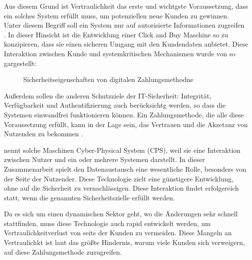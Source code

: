 \vspace{1cm}



Aus diesem Grund ist Vertraulichkeit das erste und wichtgste Voraussetzung, dass ein solches System 
erfüllt muss, um potenziellen neue Kunden zu gewinnen. Unter diesem Begriff soll ein System nur auf 
autorisierte Informationen zugreifen \cite{refbook:SWIS}. In dieser Hinsicht ist die Entwicklung 
einer Click and Buy Maschine so zu konzipieren, dass sie einen sicheren Umgang mit den Kundendaten
anbietet. Diese Interaktion zwischen Kunde und systemkritischen Mechanismen wurde von \cite{refart:HARE}
so gargestellt: 

\begin{figure}[htb]
    \caption{Sicherheitseigenschaften von digitalen Zahlungsmethodne}
    \label{fig:refark_HARE}
\end{figure}


Außerdem sollen die anderen Schutzziele der IT-Sicherheit: Integrität, Verfügbarkeit und
Authentifizierung auch berücksichtg werden, so dass die Systemen einwandfrei funktionieren können.
Ein Zahlungsmethode, die alle diese Voraussetzung erfüllt, kann in der Lage sein, das Vertrauen und 
die Akzetanz von Nutzenden zu bekommen \cite{refart:HARE}. \par


\cite{inbook:MHNS} nennt solche Maschinen Cyber-Physical System (CPS), weil sie eine Interaktion zwischen 
Nutzer und ein oder mehrere Systemen darstellt. In dieser Zusammenarbeit spielt den Datenaustausch 
eine wesentliche Rolle, besonders von der Seite der Nutzender. Diese Technologie zielt eine günstigere 
Entwicklung, ohne auf die Sicherheit zu vernachlässigen. Diese Interaktion findet erfolgereich statt, 
wenn die genannten Sicherheitszielle erfüllt werden.


Da es sich um einen dynamischen Sektor geht, wo die Änderungen sehr schnell stattfinden, \cite{S} 
muss diese Technologie auch rapid entwickelt werden, um Vertraulichkeitverlust von seits der Kunden zu 
vermeiden. Diese Mangeln an Vertraulichkt ist laut das größte Hindernis, warum viele Kunden sich 
verweigern, auf diese Zahlungsmethode zuzugreifen.

